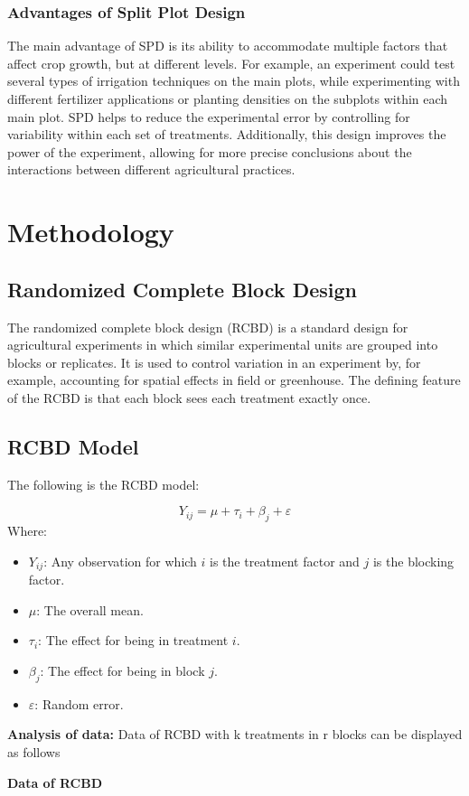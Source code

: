 \documentclass[oneside,12pt,fleqn]{book}
\begin{document}
\subsection{Advantages of Split Plot Design}
The main advantage of SPD is its ability to accommodate multiple factors that affect crop growth, but at different levels. For example, an experiment could test several types of irrigation techniques on the main plots, while experimenting with different fertilizer applications or planting densities on the subplots within each main plot. SPD helps to reduce the experimental error by controlling for variability within each set of treatments. Additionally, this design improves the power of the experiment, allowing for more precise conclusions about the interactions between different agricultural practices.

\chapter{Methodology}
\section{Randomized Complete Block Design}
The randomized complete block design (RCBD) is a standard design for agricultural experiments in which similar experimental units are grouped  into blocks or replicates. It is used to control variation in an experiment by, for example, accounting for spatial effects in field or greenhouse. The 
defining feature of the RCBD is that each block sees each treatment exactly once.
\section{RCBD Model}

The following is the RCBD model:

\[
Y_{ij} = \mu + \tau_i + \beta_j + \varepsilon
\]
Where: 
\begin{itemize}
    \item \( Y_{ij} \): Any observation for which \( i \) is the treatment factor and \( j \) is the blocking factor.
    \item \( \mu \): The overall mean.
    \item \( \tau_i \): The effect for being in treatment \( i \).
    \item \( \beta_j \): The effect for being in block \( j \).
    \item \( \varepsilon \): Random error.
\end{itemize}
\textbf{Analysis of data: }Data of RCBD with k treatments in r blocks can be displayed as follows 
\begin{center}
    \textbf{Data of RCBD}
\end{center}
\end{document}
